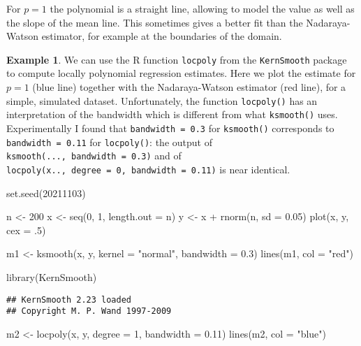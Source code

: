 \documentclass[
  a4paper,
]{article}
\newenvironment{Shaded}{\begin{snugshade}}{\end{snugshade}}
\newcommand{\AttributeTok}[1]{\textcolor[rgb]{0.77,0.63,0.00}{#1}}
\newcommand{\DecValTok}[1]{\textcolor[rgb]{0.00,0.00,0.81}{#1}}
\newcommand{\FloatTok}[1]{\textcolor[rgb]{0.00,0.00,0.81}{#1}}
\newcommand{\FunctionTok}[1]{\textcolor[rgb]{0.00,0.00,0.00}{#1}}
\newcommand{\NormalTok}[1]{#1}
\newcommand{\OtherTok}[1]{\textcolor[rgb]{0.56,0.35,0.01}{#1}}
\newcommand{\SpecialCharTok}[1]{\textcolor[rgb]{0.00,0.00,0.00}{#1}}
\newcommand{\StringTok}[1]{\textcolor[rgb]{0.31,0.60,0.02}{#1}}
\theoremstyle{definition}
\theoremstyle{definition}
\newtheorem{example}{Example}[section]
\theoremstyle{definition}
\theoremstyle{definition}
\theoremstyle{remark}
\begin{document}
For \(p=1\) the polynomial is a straight line, allowing to model the
value as well as the slope of the mean line. This sometimes gives
a better fit than the Nadaraya-Watson estimator, for example at the boundaries
of the domain.

\begin{example}
We can use the R function \texttt{locpoly} from the \texttt{KernSmooth} package to
compute locally polynomial regression estimates. Here we plot
the estimate for \(p=1\) (blue line) together with the Nadaraya-Watson
estimator (red line), for a simple, simulated dataset.
Unfortunately, the function \texttt{locpoly()} has an interpretation of the bandwidth
which is different from what \texttt{ksmooth()} uses. Experimentally I found
that \texttt{bandwidth\ =\ 0.3} for \texttt{ksmooth()} corresponds to
\texttt{bandwidth\ =\ 0.11} for \texttt{locpoly()}: the output of
\texttt{ksmooth(...,\ bandwidth\ =\ 0.3)}
and of \texttt{locpoly(x..,\ degree\ =\ 0,\ bandwidth\ =\ 0.11)} is near identical.

\begin{Shaded}
\begin{Highlighting}[]
\FunctionTok{set.seed}\NormalTok{(}\DecValTok{20211103}\NormalTok{)}

\NormalTok{n }\OtherTok{\textless{}{-}} \DecValTok{200}
\NormalTok{x }\OtherTok{\textless{}{-}} \FunctionTok{seq}\NormalTok{(}\DecValTok{0}\NormalTok{, }\DecValTok{1}\NormalTok{, }\AttributeTok{length.out =}\NormalTok{ n)}
\NormalTok{y }\OtherTok{\textless{}{-}}\NormalTok{ x }\SpecialCharTok{+} \FunctionTok{rnorm}\NormalTok{(n, }\AttributeTok{sd =} \FloatTok{0.05}\NormalTok{)}
\FunctionTok{plot}\NormalTok{(x, y, }\AttributeTok{cex =}\NormalTok{ .}\DecValTok{5}\NormalTok{)}

\NormalTok{m1 }\OtherTok{\textless{}{-}} \FunctionTok{ksmooth}\NormalTok{(x, y, }\AttributeTok{kernel =} \StringTok{"normal"}\NormalTok{, }\AttributeTok{bandwidth =} \FloatTok{0.3}\NormalTok{)}
\FunctionTok{lines}\NormalTok{(m1, }\AttributeTok{col =} \StringTok{"red"}\NormalTok{)}

\FunctionTok{library}\NormalTok{(KernSmooth)}
\end{Highlighting}
\end{Shaded}

\begin{verbatim}
## KernSmooth 2.23 loaded
## Copyright M. P. Wand 1997-2009
\end{verbatim}

\begin{Shaded}
\begin{Highlighting}[]
\NormalTok{m2 }\OtherTok{\textless{}{-}} \FunctionTok{locpoly}\NormalTok{(x, y, }\AttributeTok{degree =} \DecValTok{1}\NormalTok{, }\AttributeTok{bandwidth =} \FloatTok{0.11}\NormalTok{)}
\FunctionTok{lines}\NormalTok{(m2, }\AttributeTok{col =} \StringTok{"blue"}\NormalTok{)}
\end{Highlighting}
\end{Shaded}


\end{example}
\end{document}

